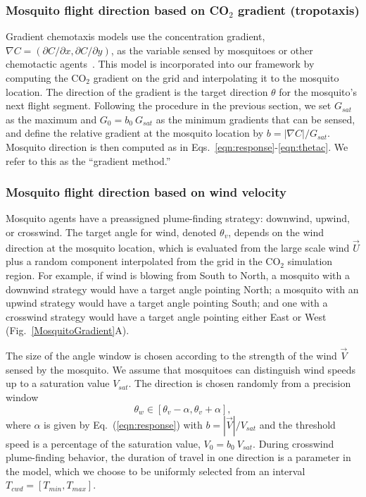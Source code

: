 \documentclass[10pt]{article}
\begin{document}
\subsubsection*{Mosquito flight direction based on CO$_2$ gradient (tropotaxis)}
Gradient chemotaxis models use the concentration gradient, $\nabla C = (\partial C /\partial x,\partial C /\partial y )$, as the variable sensed by 
mosquitoes or other chemotactic agents~\cite{KellerSegel,Hortsmann}.  This model is incorporated into our framework 
by computing the CO$_2$ gradient on the grid and
interpolating it to
the mosquito location.  The direction of the gradient
is the target direction $\theta$ for the mosquito's next flight
segment. 
Following the procedure in the previous section, we set $G_{sat}$ as the maximum 
 and $G_0 = b_0\ G_{sat}$ as the minimum gradients that can be sensed, and define the relative gradient at  the mosquito
location by $b = |\nabla C|/G_{sat}$.  
Mosquito direction is then computed as in Eqs.~\eqref{eqn:response}-\eqref{eqn:thetac}.  We refer to this as the ``gradient method.''

\subsubsection*{Mosquito flight direction based on wind velocity}
Mosquito agents have a preassigned plume-finding strategy: downwind, upwind, or crosswind.
The target angle for wind, denoted $\theta_v$, depends on the wind direction at the mosquito location, which is
evaluated from the large scale wind $\vec{U}$ plus a random component
interpolated from the grid in the CO$_2$ simulation region.  
For example, if wind is blowing from South to North, a mosquito with a downwind strategy would have a target angle pointing North; a mosquito with an upwind strategy would have a target angle pointing South; and one with
a crosswind strategy would have a target angle pointing either East or West (Fig.~\ref{MosquitoGradient}A).

The size of the angle window is chosen according to the strength of the wind $\vec V$ sensed by the mosquito.  
We assume that mosquitoes can distinguish wind speeds up to a saturation value $V_{sat}$.  The direction is chosen randomly from a precision window
\begin{equation}
	 \theta_w \in [\theta_v-\alpha,\theta_v+\alpha], \label{eqn:thetav}
\end{equation}
where $\alpha$ is given by Eq.~(\ref{eqn:response}) with $b = |\vec{V}|/V_{sat}$ and the threshold speed 
is a percentage of the saturation value, $V_0 = b_0\ V_{sat}$. 
During crosswind plume-finding behavior, the duration of travel in one direction is a parameter in
the model, which we choose to be uniformly selected
from an interval $T_{cwd} = [T_{min},T_{max}]$.
\end{document}
